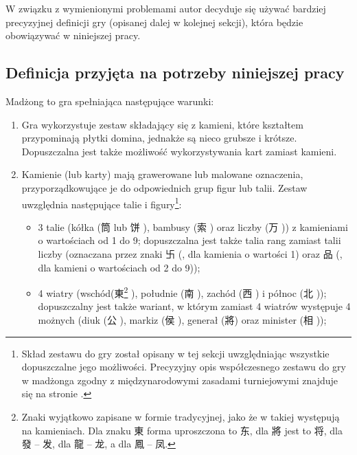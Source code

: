 W związku z wymienionymi problemami autor decyduje się używać bardziej
precyzyjnej definicji gry (opisanej dalej w kolejnej sekcji), która będzie
obowiązywać w niniejszej pracy.
\subsection{Definicja przyjęta na potrzeby niniejszej pracy}
\label{definicja}
Madżong to gra spełniająca %
następujące warunki:

\begin{enumerate}[label={\alph*)}] \item Gra wykorzystuje zestaw składający się
z kamieni, które kształtem przypominają płytki domina, jednakże są nieco grubsze
i krótsze. Dopuszczalna jest także możliwość wykorzystywania kart zamiast
kamieni.
\item Kamienie (lub karty) mają grawerowane lub malowane oznaczenia,
przyporządkowujące je do odpowiednich grup figur lub talii. Zestaw uwzględnia
następujące talie i figury\footnote{Skład zestawu do gry został opisany w tej
sekcji uwzględniając wszystkie dopuszczalne jego możliwości.
Precyzyjny opis współczesnego zestawu do gry w madżonga zgodny z
międzynarodowymi zasadami turniejowymi znajduje się  na stronie
\pageref{guobiao_zestaw}.}:
	\begin{itemize}
	  \item 3 talie (kółka (筒  lub 饼 ), bambusy (索
	  ) oraz liczby (万 )) z kamieniami o
wartościach od 1 do 9; dopuszczalna jest także talia rang zamiast talii liczby
(oznaczana przez znaki 卐 (, dla kamienia o wartości 1) oraz 品 
(, dla kamieni o wartościach od 2 do 9)); 
\item 4 wiatry \label{wiatry}
(wschód(東\footnote{\label{definicja_tradycyjne}Znaki wyjątkowo zapisane w formie tradycyjnej, jako że w takiej występują na kamieniach. Dla znaku 東  forma
uproszczona to 东, dla 將 jest to 将, dla 發 -- 发, dla 龍 -- 龙, a dla 鳳 -- 凤.} 
), południe (南 ), zachód (西 ) i północ (北
));  dopuszczalny jest także wariant, w którym zamiast 4 wiatrów
występuje 4 możnych (diuk (公 ),  markiz (侯 ),  generał
(將\footnotemark[2] ) oraz minister (相 ));

\end{itemize}
\end{enumerate}
